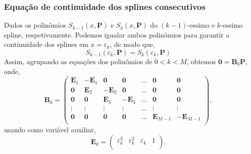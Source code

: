 \documentclass[a4paper,10pt]{article}
\begin{document}
\subsubsection{Equação de continuidade dos splines consecutivos}
\label{subsubsec:part0}
Dados os polinômios $S_{k-1}(x,\mathbf{P})$ e $S_{k}(x,\mathbf{P})$ do $(k-1)$-essimo e $k$-essimo spline,
respetivamente. Podemos igualar ambos polinômios para garantir a continuidade dos splines em $x=\varepsilon_{k}$, 
de modo que,
\begin{equation}
 S_{k-1}(\varepsilon_{k},\mathbf{P})=S_{k}(\varepsilon_{k},\mathbf{P})
\end{equation}
Assim, agrupando as equações dos polinômios de  $0<k<M$, obtemos $\mathbf{0}=\mathbf{B}_0 \mathbf{P}$, onde,
\begin{equation}
\mathbf{B}_0 =\left(\begin{matrix}
\mathbf{E}_1 & -\mathbf{E}_1   & \mathbf{0}    &  \mathbf{0}   & \dots & \mathbf{0} & \mathbf{0}\\
\mathbf{0}   &  \mathbf{E}_2   & -\mathbf{E}_2 &  \mathbf{0}   & \dots & \mathbf{0} & \mathbf{0}\\
\mathbf{0}   &  \mathbf{0}     &  \mathbf{E}_3 & -\mathbf{E}_3 & \dots & \mathbf{0} & \mathbf{0}\\
\vdots       &  \vdots         &  \vdots       &  \vdots       & \dots & \vdots     & \vdots\\
\mathbf{0}   &  \mathbf{0}     &  \mathbf{0}   &  \mathbf{0}   & \dots & \mathbf{E}_{M-1} & -\mathbf{E}_{M-1} \\
\end{matrix}\right),
\end{equation}
usando como variável auxiliar,
\begin{equation}
\mathbf{E}_k =\left(\begin{matrix}
\varepsilon^3_k & \varepsilon^2_k   & \varepsilon_k & 1  \\
\end{matrix}\right).
\end{equation}
\end{document}
